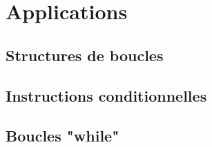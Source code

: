 \section{Applications}
\subsection{Structures de boucles}
\setcounter{thequestion}{0}

\subsection{Instructions conditionnelles}
\setcounter{thequestion}{0}

\subsection{Boucles "while"}
\setcounter{thequestion}{0}

